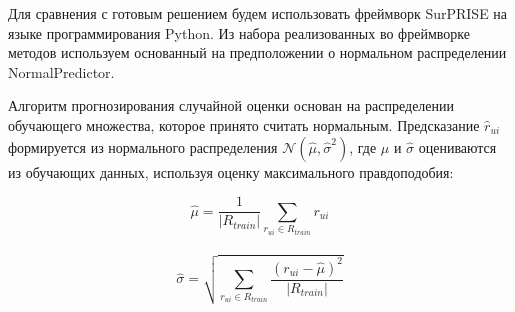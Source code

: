 Для сравнения с готовым решением будем использовать фреймворк SurPRISE \cite{sur} на языке программирования Python.
Из набора реализованных во фреймворке методов используем основанный на предположении о нормальном распределении NormalPredictor.

Алгоритм прогнозирования случайной оценки основан на распределении обучающего множества, которое принято считать нормальным.
Предсказание ${\hat r_{ui}}$ формируется из нормального распределения ${\mathcal{N}(\hat{\mu}, \hat{\sigma}^2)}$,
где ${\hat \mu}$ и ${\hat \sigma}$ оцениваются из обучающих данных, используя оценку максимального правдоподобия:

\begin{equation}
  \hat{\mu} = \frac{1}{|R_{train}|} \sum_{r_{ui} \in R_{train}} r_{ui}
\end{equation} 
\\
\begin{equation}
  \hat{\sigma} = \sqrt{\sum_{r_{ui} \in R_{train}} \frac{(r_{ui} - \hat{\mu})^2}{|R_{train}|}}
\end{equation}